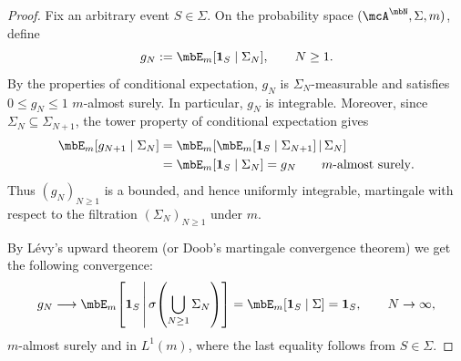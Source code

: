 \documentclass[a4paper]{article}
\numberwithin{equation}{section}   %
\theoremstyle{plain}   %
\theoremstyle{plain}   %
\theoremstyle{examplestyle}
\begin{document}
\begin{proof}
   Fix an arbitrary event $S\in\Sigma$. 
   On the probability space $(\mcA^\mbN,\Sigma,m)$, define
    \[
        g_N:=\mbE_m[\mathbf1_S\mid\Sigma_N],
        \qquad N\ge1.
    \]
    By the properties of conditional expectation, $g_N$ is $\Sigma_N$-measurable and satisfies $0\le g_N\le1$ $m$-almost surely. 
    In particular, $g_N$ is integrable. 
    Moreover, since
    $\Sigma_N\subseteq\Sigma_{N+1}$, the tower property of conditional expectation gives
    \[
        \begin{aligned}
            \mbE_m[g_{N+1}\mid\Sigma_N]
            &=
            \mbE_m\!\left[
                \mbE_m[\mathbf1_S\mid\Sigma_{N+1}]
                \,\middle|\,\Sigma_N
            \right]\\
            &=
            \mbE_m[\mathbf1_S\mid\Sigma_N]
            =g_N
            \qquad m\text{-almost surely}.
        \end{aligned}
    \]
    Thus $(g_N)_{N\ge1}$ is a bounded, and hence uniformly integrable, martingale with respect to the filtration $(\Sigma_N)_{N\ge1}$ under $m$.

    By L\'evy's upward theorem (or Doob’s martingale convergence theorem) we get the following convergence:
    \[
        g_N
        \longrightarrow
        \mbE_m\!\left[
            \mathbf1_S
            \,\middle|\,
            \sigma\!\left(\bigcup_{N\ge1}\Sigma_N\right)
        \right]
        =
        \mbE_m[\mathbf1_S\mid\Sigma]
        =
        \mathbf1_S, \qquad N \to \infty,
    \]
    $m$-almost surely and in $L^1(m)$, where the last  equality follows from $S\in\Sigma$.


\end{proof}
\end{document}
